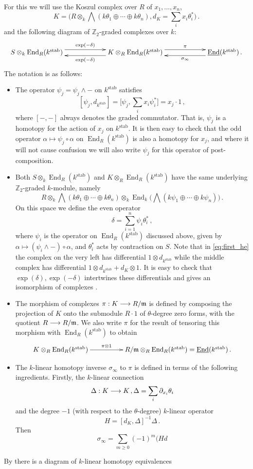 \documentclass[english,letter paper,12pt,leqno]{article}
\theoremstyle{example}
\numberwithin{equation}{section}
\def\stab{\operatorname{stab}}
\def\be{\begin{equation}}
\def\ee{\end{equation}}
\def\nZ{\mathds{Z}}
\DeclareMathOperator{\End}{End}
\begin{document}
For this we will use the Koszul complex over $R$ of $x_1,\ldots,x_n$,
\be\label{eq:defnkoszulK}
K = \Big( R \otimes_k \bigwedge( k\theta_1 \oplus \cdots \oplus k \theta_n ), d_K = \sum_i x_i \theta_i^* \Big)\,.
\ee
and the following diagram of $\nZ_2$-graded complexes over $k$:
\be\label{eq:first_he}
\xymatrix@C+3pc{
S \otimes_k \End_R(k^{\stab}) \ar@<1ex>[r]^-{\exp(-\delta)} & K \otimes_R \End_R(k^{\stab}) \ar@<1ex>[l]^-{ \exp(-\delta) } \ar@<1ex>[r]^-{\pi} & \underline{\End}(k^{\stab})\,.\ar@<1ex>[l]^-{ \sigma_\infty }
}
\ee
The notation is as follows:
\begin{itemize}
\item The operator $\psi_j = \psi_j \wedge -$ on $k^{\stab}$ satisfies
\[
[ \psi_j, d_{k^{\stab}} ] = \big[ \psi_j, \sum_i x_i \psi_i^* \big] = x_j \cdot 1\,,
\]
where $[-,-]$ always denotes the graded commutator. That is, $\psi_j$ is a homotopy for the action of $x_j$ on $k^{\stab}$. It is then easy to check that the odd operator $\alpha \mapsto \psi_j \circ \alpha$ on $\End_R(k^{\stab})$ is also a homotopy for $x_j$, and where it will not cause confusion we will also write $\psi_j$ for this operator of post-composition.

\item Both $S \otimes_k \End_R(k^{\stab})$ and $K \otimes_R \End_R(k^{\stab})$ have the same underlying $\nZ_2$-graded $k$-module, namely
\[
R \otimes_k \bigwedge( k\theta_1 \oplus \cdots \oplus k \theta_n ) \otimes_k \End_k\big( \bigwedge( k\psi_1 \oplus \cdots \oplus k \psi_n ) \big)\,.
\]
On this space we define the even operator
\be
\delta = \sum_{i=1}^n \psi_i \theta_i^*\,,
\ee
where $\psi_i$ is the operator on $\End_R(k^{\stab})$ discussed above, given by $\alpha \mapsto (\psi_i \wedge -) \circ \alpha$, and $\theta_i^*$ acts by contraction on $S$. Note that in \eqref{eq:first_he} the complex on the very left has differential $1 \otimes d_{k^{\stab}}$ while the middle complex has differential $1 \otimes d_{k^{\stab}} + d_K \otimes 1$. It is easy to check that $\exp(\delta),\exp(-\delta)$ intertwines these differentials and gives an isomorphism of complexes \cite[Proposition 4.11]{murfet}.
\item The morphism of complexes $\pi: K \longrightarrow R/\mathfrak{m}$ is defined by composing the projection of $K$ onto the submodule $R \cdot 1$ of $\theta$-degree zero forms, with the quotient $R \longrightarrow R/\mathfrak{m}$. We also write $\pi$ for the result of tensoring this morphism with $\End_R(k^{\stab})$ to obtain
\[
\xymatrix@C+2pc{
K \otimes_R \End_R(k^{\stab}) \ar[r]^-{\pi \otimes 1} & R/\mf{m} \otimes_R \End_R(k^{\stab}) = \underline{\End}(k^{\stab})\,.
}
\]
\item The $k$-linear homotopy inverse $\sigma_\infty$ to $\pi$ is defined in terms of the following ingredients. Firstly, the $k$-linear connection
\[
\Delta: K \longrightarrow K\,, \Delta = \sum_i \partial_{x_i} \theta_i
\]
and the degree $-1$ (with respect to the $\theta$-degree) $k$-linear operator
\[
H = [d_K, \Delta]^{-1} \Delta\,.
\]
Then
\[
\sigma_\infty = \sum_{m \ge 0} (-1)^m (H d
\]
\end{itemize}
By \cite{murfet} there is a diagram of $k$-linear homotopy equivalences
\end{document}
